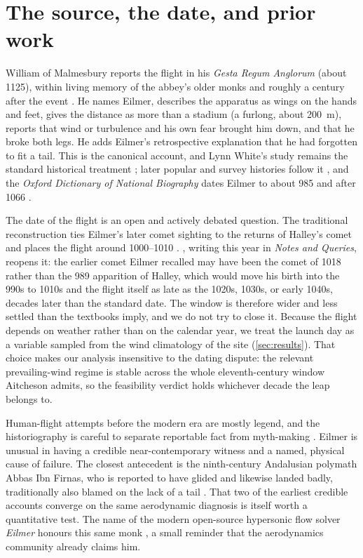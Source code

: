 \section{The source, the date, and prior work}

William of Malmesbury reports the flight in his \textit{Gesta Regum Anglorum}
(about 1125), within living memory of the abbey's older monks and roughly a century
after the event \autocite{williamMalmesbury_gesta}.
He names Eilmer, describes the apparatus as wings on the hands and feet, gives the
distance as more than a stadium (a furlong, about \SI{200}{\meter}), reports that
wind or turbulence and his own fear brought him down, and that he broke both legs.
He adds Eilmer's retrospective explanation that he had forgotten to fit a tail.
This is the canonical account, and Lynn White's study remains the standard
historical treatment \autocite{white1961eilmer}; later popular and survey histories
follow it \autocite{hallion2003takingflight,scott1995shoulders,lacey2004greattales},
and the \textit{Oxford Dictionary of National Biography} dates Eilmer to about
985 and after 1066 \autocite{thomson2004eilmer_odnb}.

The date of the flight is an open and actively debated question.
The traditional reconstruction ties Eilmer's later comet sighting to the returns of
Halley's comet and places the flight around 1000--1010
\autocite{woosnam1986eilmer,lewispz_bayeuxcomet}.
\textcite{aitcheson2026date}, writing this year in \textit{Notes and Queries},
reopens it: the earlier comet Eilmer recalled may have been the comet of 1018 rather
than the 989 apparition of Halley, which would move his birth into the 990s to 1010s
and the flight itself as late as the 1020s, 1030s, or early 1040s, decades later than
the standard date.
The window is therefore wider and less settled than the textbooks imply, and we do
not try to close it.
Because the flight depends on weather rather than on the calendar year, we treat the
launch day as a variable sampled from the wind climatology of the site
(\cref{sec:results}).
That choice makes our analysis insensitive to the dating dispute: the relevant
prevailing-wind regime is stable across the whole eleventh-century window Aitcheson
admits, so the feasibility verdict holds whichever decade the leap belongs to.

Human-flight attempts before the modern era are mostly legend, and the
historiography is careful to separate reportable fact from myth-making
\autocite{paz2013humanflight}.
Eilmer is unusual in having a credible near-contemporary witness and a named,
physical cause of failure.
The closest antecedent is the ninth-century Andalusian polymath Abbas Ibn Firnas,
who is reported to have glided and likewise landed badly, traditionally also blamed
on the lack of a tail \autocite{anderson2024bridge}.
That two of the earliest credible accounts converge on the same aerodynamic
diagnosis is itself worth a quantitative test.
The name of the modern open-source hypersonic flow solver \textit{Eilmer} honours
this same monk \autocite{gibbons2022eilmer,jacobs2017eilmer4}, a small reminder that
the aerodynamics community already claims him.
